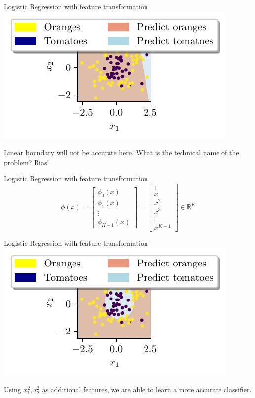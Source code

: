 \documentclass{beamer}
\begin{document}
\begin{frame}{Logistic Regression with feature transformation}
\includegraphics{../assets/logistic-regression/figures/logisitic-linear-prediction.pdf}

Linear boundary will not be accurate here. What is the technical name of the problem?
\pause Bias! 
\end{frame}

\begin{frame}{Logistic Regression with feature transformation}
$$
\phi(x)=\left[\begin{array}{c}
{\phi_{0}(x)} \\
{\phi_{1}(x)} \\
{\vdots} \\
{\phi_{K-1}(x)}
\end{array}\right]=\left[\begin{array}{c}
{1} \\
{x} \\
{x^{2}} \\
{x^{3}} \\
{\vdots} \\
{x^{K-1}}
\end{array}\right] \in \mathbb{R}^{K}
$$
\end{frame}


\begin{frame}{Logistic Regression with feature transformation}
\includegraphics{../assets/logistic-regression/figures/logisitic-circular-prediction.pdf}

Using $x_1^2, x_2^2$ as additional features, we are able to learn a more accurate classifier. 
\end{frame}
\end{document}
